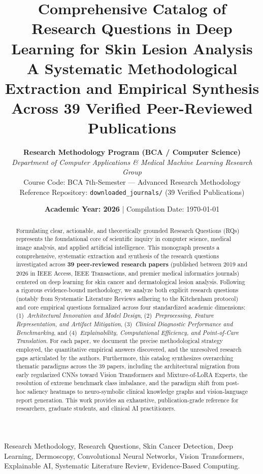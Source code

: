 \title{\Huge\textbf{Comprehensive Catalog of Research Questions in Deep Learning for Skin Lesion Analysis}\\[0.3em]
\Large\textbf{A Systematic Methodological Extraction and Empirical Synthesis Across 39 Verified Peer-Reviewed Publications}}

\author{
    \textbf{Research Methodology Program (BCA / Computer Science)}\\[0.2em]
    \textit{Department of Computer Applications \& Medical Machine Learning Research Group}\\
    Course Code: BCA 7th-Semester --- Advanced Research Methodology\\
    Reference Repository: \texttt{downloaded\_journals/} (39 Verified Publications)
}

\date{\textbf{Academic Year: 2026} \quad | \quad Compilation Date: \today}

\maketitle
\thispagestyle{empty}

\begin{abstract}
\noindent Formulating clear, actionable, and theoretically grounded Research Questions (RQs) represents the foundational core of scientific inquiry in computer science, medical image analysis, and applied artificial intelligence. This monograph presents a comprehensive, systematic extraction and synthesis of the research questions investigated across \textbf{39 peer-reviewed research papers} (published between 2019 and 2026 in IEEE Access, IEEE Transactions, and premier medical informatics journals) centered on deep learning for skin cancer and dermatological lesion analysis. Following a rigorous evidence-bound methodology, we analyze both explicit research questions (notably from Systematic Literature Reviews adhering to the Kitchenham protocol) and core empirical questions formalized across four standardized academic dimensions: (1)~\textit{Architectural Innovation and Model Design}, (2)~\textit{Preprocessing, Feature Representation, and Artifact Mitigation}, (3)~\textit{Clinical Diagnostic Performance and Benchmarking}, and (4)~\textit{Explainability, Computational Efficiency, and Point-of-Care Translation}. For each paper, we document the precise methodological strategy employed, the quantitative empirical answers discovered, and the unresolved research gaps articulated by the authors. Furthermore, this catalog synthesizes overarching thematic paradigms across the 39 papers, including the architectural migration from early regularized CNNs toward Vision Transformers and Mixture-of-LoRA Experts, the resolution of extreme benchmark class imbalance, and the paradigm shift from post-hoc saliency heatmaps to neuro-symbolic clinical knowledge graphs and vision-language report generation. This work provides an exhaustive, publication-grade reference for researchers, graduate students, and clinical AI practitioners.
\end{abstract}

\begin{IEEEkeywords}
Research Methodology, Research Questions, Skin Cancer Detection, Deep Learning, Dermoscopy, Convolutional Neural Networks, Vision Transformers, Explainable AI, Systematic Literature Review, Evidence-Based Computing.
\end{IEEEkeywords}

\newpage
